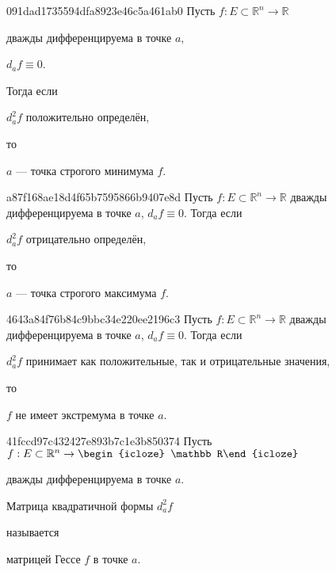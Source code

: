 \begin{note}{091dad1735594dfa8923e46c5a461ab0}
    Пусть \({ f : E \subset \mathbb R^{n} \to \mathbb R }\) \begin{icloze}{4}дважды дифференцируема в точке \({ a }\),\end{icloze} \begin{icloze}{3}\({ d_{a}f \equiv 0 }\).\end{icloze}
    Тогда если \begin{icloze}{2}\({ d_{a}^2f }\) положительно определён,\end{icloze} то \begin{icloze}{1}\({ a }\) --- точка строгого минимума \({ f }\).\end{icloze}
\end{note}

\begin{note}{a87f168ae18d4f65b7595866b9407e8d}
    Пусть \({ f : E \subset \mathbb R^{n} \to \mathbb R }\) дважды дифференцируема в точке \({ a }\), \({ d_{a}f \equiv 0 }\).
    Тогда если \begin{icloze}{2}\({ d_{a}^2f }\) отрицательно определён,\end{icloze} то \begin{icloze}{1}\({ a }\) --- точка строгого максимума \({ f }\).\end{icloze}
\end{note}

\begin{note}{4643a84f76b84c9bbc34e220ee2196c3}
    Пусть \({ f : E \subset \mathbb R^{n} \to \mathbb R }\) дважды дифференцируема в точке \({ a }\), \({ d_{a}f \equiv 0 }\).
    Тогда если \begin{icloze}{2}\({ d_{a}^2f }\) принимает как положительные, так и отрицательные значения,\end{icloze} то \begin{icloze}{1}\({ f }\) не имеет экстремума в точке \({ a }\).\end{icloze}
\end{note}

\begin{note}{41fccd97c432427e893b7c1e3b850374}
    Пусть \({ f : E \subset \mathbb R^{n} \to \begin{icloze}{4}\mathbb R\end{icloze} }\) \begin{icloze}{3}дважды дифференцируема в точке \({ a }\).\end{icloze}
    \begin{icloze}{2}Матрица квадратичной формы \({ d_{a}^2f }\)\end{icloze} называется \begin{icloze}{1}матрицей Гессе \({ f }\) в точке \({ a }\).\end{icloze}
\end{note}

